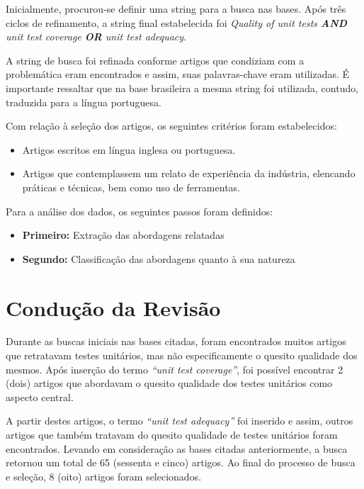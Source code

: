 \begin{apendicesenv}
Inicialmente, procurou-se definir uma string para a busca nas bases. Após três ciclos de refinamento, a string final estabelecida foi \textit{Quality of unit tests \textbf{AND} unit test coverage \textbf{OR} unit test adequacy}.

A string de busca foi refinada conforme artigos que condiziam com a problemática eram encontrados e assim, suas palavras-chave eram utilizadas. É importante ressaltar que na base brasileira a mesma string foi utilizada, contudo, traduzida para a língua portuguesa.

Com relação à seleção dos artigos, os seguintes critérios foram estabelecidos:

\begin{itemize}
	\item Artigos escritos em língua inglesa ou portuguesa.
	\item Artigos que contemplassem um relato de experiência da indústria, elencando práticas e técnicas, bem como uso de ferramentas.
\end{itemize}

Para a análise dos dados, os seguintes passos foram definidos:

\begin{itemize}
	\item \textbf{Primeiro:} Extração das abordagens relatadas
	\item \textbf{Segundo:} Classificação das abordagens quanto à sua natureza
\end{itemize}

\section{Condução da Revisão}

Durante as buscas iniciais nas bases citadas, foram encontrados muitos artigos que
retratavam testes unitários, mas não especificamente o quesito qualidade dos mesmos. Após
inserção do termo \textit{“unit test coverage”}, foi possível encontrar 2 (dois) artigos que
abordavam o quesito qualidade dos testes unitários como aspecto central.

A partir destes artigos, o termo \textit{“unit test adequacy”} foi inserido e assim, outros
artigos que também tratavam do quesito qualidade de testes unitários foram encontrados.
Levando em consideração as bases citadas anteriormente, a busca retornou um total de 65
(sessenta e cinco) artigos. Ao final do processo de busca e seleção, 8 (oito) artigos foram
selecionados.

\end{apendicesenv}

